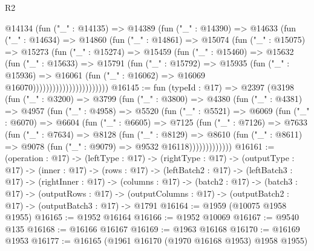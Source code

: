 \begin{lexlean}{R2}
\begin{coremodule}
                          @14134
                            (fun ("_" : @14135) =>
                            @14389
                              (fun ("_" : @14390) =>
                              @14633
                                (fun ("_" : @14634) =>
                                @14860
                                  (fun ("_" : @14861) =>
                                  @15074
                                    (fun ("_" : @15075) =>
                                    @15273
                                      (fun ("_" : @15274) =>
                                      @15459
                                        (fun ("_" : @15460) =>
                                        @15632
                                          (fun ("_" : @15633) =>
                                          @15791
                                            (fun ("_" : @15792) =>
                                            @15935
                                              (fun ("_" : @15936) =>
                                              @16061
                                                (fun ("_" : @16062) =>
                                                @16069 @16070)))))))))))))))))))))))
@16145 := fun (typeId : @17) =>
  @2397
    (@3198
      (fun ("_" : @3200) =>
      @3799
        (fun ("_" : @3800) =>
        @4380
          (fun ("_" : @4381) =>
          @4957
            (fun ("_" : @4958) =>
            @5520
              (fun ("_" : @5521) =>
              @6069
                (fun ("_" : @6070) =>
                @6604
                  (fun ("_" : @6605) =>
                  @7125
                    (fun ("_" : @7126) =>
                    @7633
                      (fun ("_" : @7634) =>
                      @8128
                        (fun ("_" : @8129) =>
                        @8610
                          (fun ("_" : @8611) =>
                          @9078 (fun ("_" : @9079) => @9532 @16118)))))))))))))
@16161 := (operation : @17) ->
  (leftType : @17) ->
  (rightType : @17) ->
  (outputType : @17) ->
  (inner : @17) ->
  (rows : @17) ->
  (leftBatch2 : @17) ->
  (leftBatch3 : @17) ->
  (rightInner : @17) ->
  (columns : @17) ->
  (batch2 : @17) ->
  (batch3 : @17) ->
  (outputRows : @17) ->
  (outputColumns : @17) -> (outputBatch2 : @17) -> (outputBatch3 : @17) -> @1791
@16164 := @1959 (@10075 @1958 @1955)
@16165 := @1952 @16164
@16166 := @1952 @10069
@16167 := @9540 @135
@16168 := @16166 @16167
@16169 := @1963 @16168
@16170 := @16169 @1953
@16177 := @16165 (@1961 @16170 (@1970 @16168 @1953) @1958 @1955)

\end{coremodule}
\end{lexlean}
